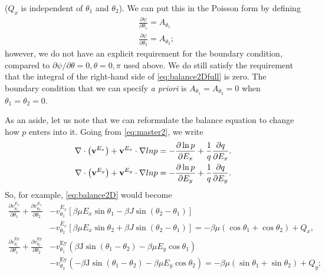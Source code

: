 \documentclass[11pt,reqno]{amsart}
\begin{document}
($Q_x$ is independent of $\theta_1$ and $\theta_2$). We can put this in the Poisson form by defining
\begin{subequations}
\label{eq:psiDef2}
\begin{align}
&\frac{\partial \psi}{\partial \theta_1} = A_{\theta_1} \\
&\frac{\partial \psi}{\partial \theta_2} = A_{\theta_2};
\end{align}
\end{subequations}
however, we do not have an explicit requirement for the boundary condition, compared to $\partial\psi/\partial\theta = 0, \theta = 0,\pi$ used above. We do still satisfy the requirement that the integral of the right-hand side of \eqref{eq:balance2Dfull} is zero. The boundary condition that we can specify \emph{a priori} is $A_{\theta_1} = A_{\theta_2} = 0$ when $\theta_1 = \theta_2 = 0$.


As an aside, let us note that we can reformulate the balance equation to change how $p$ enters into it.  Going from \eqref{eq:master2}, we write
\begin{align}
\label{eq:master3}
\nabla\cdot\left({\bf v}^{E_x}\right)+{\bf v}^{E_x}\cdot\nabla lnp&=-\frac{\partial \ln p}{\partial E_x}+\frac{1}{q}\frac{\partial q}{\partial E_x}. \nonumber \\ 
\nabla\cdot\left({\bf v}^{E_y}\right)+{\bf v}^{E_y}\cdot\nabla lnp&=-\frac{\partial \ln p}{\partial E_y}+\frac{1}{q}\frac{\partial q}{\partial E_y}.
\end{align}
So, for example, \eqref{eq:balance2D} would become
\begin{align}
\label{eq:balance2D3}
\frac{\partial { v}^{E_x}_{\theta_1}}{\partial \theta_1} + \frac{\partial { v}^{E_x}_{\theta_2}}{\partial \theta_2} 
&- { v}^{E_x}_{\theta_1} [\beta\mu E_x \sin\theta_1 - \beta J \sin(\theta_2-\theta_1)]\nonumber\\
&- { v}^{E_x}_{\theta_2} [\beta\mu E_x \sin\theta_2 + \beta J \sin(\theta_2-\theta_1)]= -\beta\mu(\cos\theta_1+\cos\theta_2) + Q_x, \nonumber \\
\frac{\partial v_{\theta _1}^{\text{Ey}}}{\partial \theta _1}+\frac{\partial v_{\theta _2}^{\text{Ey}}}{\partial \theta _2}&-v_{\theta _1}^{\text{Ey}} \left(\text{$\beta $J} \sin \left(\theta _1-\theta _2\right)-\beta  \mu E_y \cos \theta _1\right) \nonumber \\
&-v_{\theta _2}^{\text{Ey}} \left(-\text{$\beta $J} \sin \left(\theta _1-\theta _2\right)-\beta \mu E_y \cos \theta _2 \right)=-\beta \mu  \left(\sin \theta _1+\sin \theta _2\right)+Q_y;
\end{align}
\end{document}
